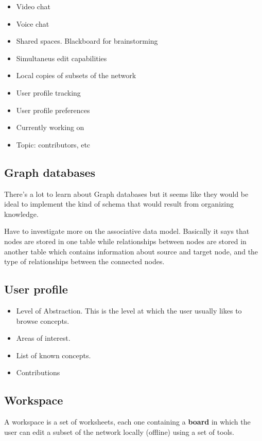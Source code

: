 \begin{itemize}
 \item Video chat
 \item Voice chat
 \item Shared spaces. Blackboard for brainstorming
 \item Simultaneus edit capabilities
 \item Local copies of subsets of the network
 \item User profile tracking
 \item User profile preferences
 \item Currently working on
 \item Topic: contributors, etc
 
\end{itemize}


\subsection{Graph databases}
There's a lot to learn about Graph databases but it
seems like they would be ideal to implement the kind
of schema that would result from organizing knowledge.

Have to investigate more on the associative data model.
Basically it says that nodes are stored in one table
while relationships between nodes are stored in another 
table which contains information about source and target 
node, and the type of relationships between the connected
nodes.

\subsection{User profile}
\begin{itemize}
 \item Level of Abstraction. This is the level at which 
 the user usually likes to browse concepts.
 \item Areas of interest.
 \item List of known concepts.
 \item Contributions
\end{itemize}

\subsection{Workspace}
A workspace is a set of worksheets, each one containing
a \textbf{board} in which the user can edit a subset of the 
network locally (offline) using a set of tools.

